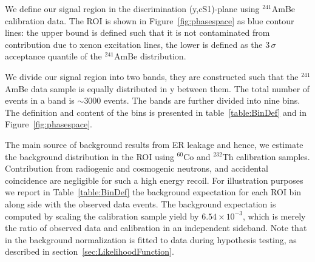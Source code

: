 We define our signal region in the discrimination (y,cS1)-plane using $^{241}$AmBe calibration data. 
The ROI is shown in Figure~\ref{fig:phasespace} as blue contour lines: the upper bound is defined such that it is not contaminated from contribution due to xenon excitation lines, the lower is defined as the 3\,$\sigma$ acceptance quantile of the $^{241}$AmBe distribution.

We divide our signal region into two bands, they are constructed such that the $^{241}$AmBe data sample is equally distributed in y between them. The total number of events in a band is $\sim3000$ events. The bands are further divided into nine bins. The definition and content of the bins is presented in table~\ref{table:BinDef} and in Figure~\ref{fig:phasespace}. 



The main source of background results from  ER leakage and hence, we estimate the background distribution in the ROI using $^{60}$Co and $^{232}$Th calibration samples.  
Contribution from radiogenic and cosmogenic neutrons, and accidental coincidence are negligible for such a high energy recoil.
For illustration purposes we report in Table~\ref{table:BinDef} the background expectation for each ROI bin along side with the observed data events. The background expectation is computed by scaling the calibration sample yield by $6.54\times10^{-3}$, which is merely the ratio of observed data and calibration in an independent sideband. Note that in the background normalization is fitted to data during hypothesis testing, as described in section~\ref{sec:LikelihoodFunction}. 



